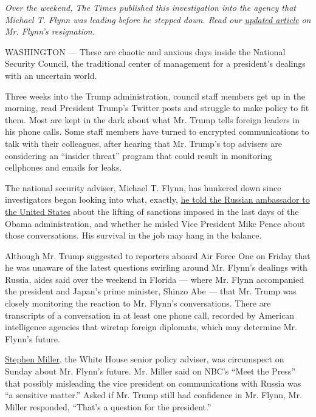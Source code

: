 \emph{Over the weekend, The Times published this investigation into the
agency that Michael T. Flynn was leading before he stepped down. Read
our}
\href{https://www.nytimes.com/2017/02/13/us/politics/donald-trump-national-security-adviser-michael-flynn.html}{\emph{updated
article}} \emph{on Mr. Flynn's resignation.}

WASHINGTON --- These are chaotic and anxious days inside the National
Security Council, the traditional center of management for a president's
dealings with an uncertain world.

Three weeks into the Trump administration, council staff members get up
in the morning, read President Trump's Twitter posts and struggle to
make policy to fit them. Most are kept in the dark about what Mr. Trump
tells foreign leaders in his phone calls. Some staff members have turned
to encrypted communications to talk with their colleagues, after hearing
that Mr. Trump's top advisers are considering an ``insider threat''
program that could result in monitoring cellphones and emails for leaks.

The national security adviser, Michael T. Flynn, has hunkered down since
investigators began looking into what, exactly,
\href{https://www.nytimes.com/2017/02/09/us/flynn-is-said-to-have-talked-to-russians-about-sanctions-before-trump-took-office.html}{he
told the Russian ambassador to the United States} about the lifting of
sanctions imposed in the last days of the Obama administration, and
whether he misled Vice President Mike Pence about those conversations.
His survival in the job may hang in the balance.

Although Mr. Trump suggested to reporters aboard Air Force One on Friday
that he was unaware of the latest questions swirling around Mr. Flynn's
dealings with Russia, aides said over the weekend in Florida --- where
Mr. Flynn accompanied the president and Japan's prime minister, Shinzo
Abe --- that Mr. Trump was closely monitoring the reaction to Mr.
Flynn's conversations. There are transcripts of a conversation in at
least one phone call, recorded by American intelligence agencies that
wiretap foreign diplomats, which may determine Mr. Flynn's future.

\href{https://www.nytimes.com/2017/02/11/us/politics/stephen-miller-donald-trump-adviser.html}{Stephen
Miller}, the White House senior policy adviser, was circumspect on
Sunday about Mr. Flynn's future. Mr. Miller said on NBC's ``Meet the
Press'' that possibly misleading the vice president on communications
with Russia was ``a sensitive matter.'' Asked if Mr. Trump still had
confidence in Mr. Flynn, Mr. Miller responded, ``That's a question for
the president.''


